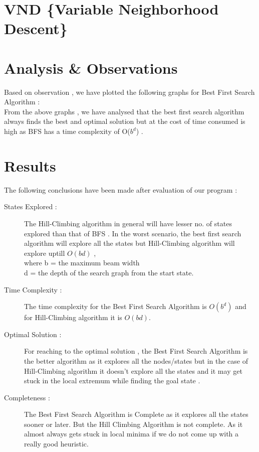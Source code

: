\documentclass{article}
\begin{document}
\section{VND\hspace*{5pt} \{Variable Neighborhood Descent\}}
\newpage
\section{Analysis \& Observations}
\vspace{5pt}
Based on observation , we have plotted the following graphs for Best First Search Algorithm :
\vspace{5pt}
\\From the above graphs , we have analysed that the best first search algorithm always finds the best and optimal solution
but at the cost of time consumed is high as BFS has a time complexity of O($b^d$) .
\newpage
\section{Results}
\vspace{20pt}
The following conclusions have been made after evaluation of our program :
\begin{description}
    \item[States Explored :]The Hill-Climbing algorithm in general will have lesser no. of states explored than that of BFS .
    In the worst scenario, the best first search algorithm will explore all the states but Hill-Climbing algorithm will explore uptill $O(bd)$ 
    ,\\ where b = the maximum beam width 
    \\\hspace*{29pt}d = the depth of the search graph from the start state.
    \item[Time Complexity :] The time complexity for the Best First Search Algorithm is $O(b^d)$ and for Hill-Climbing algorithm it is $O(bd)$.
    \item[Optimal Solution :] For reaching to the optimal solution , the Best First Search Algorithm is the better algorithm as it explores all the nodes/states
    but in the case of Hill-Climbing algorithm it doesn't explore all the states and it may get stuck in the local extremum while finding the goal state . 
    \item[Completeness :] The Best First Search Algorithm is Complete as it explores all the states sooner or later. But the Hill Climbing Algorithm is not complete. As it almost always gets stuck in local minima if we do not come up with a really good heuristic.
\end{description}
\vspace{20pt}
\end{document}
